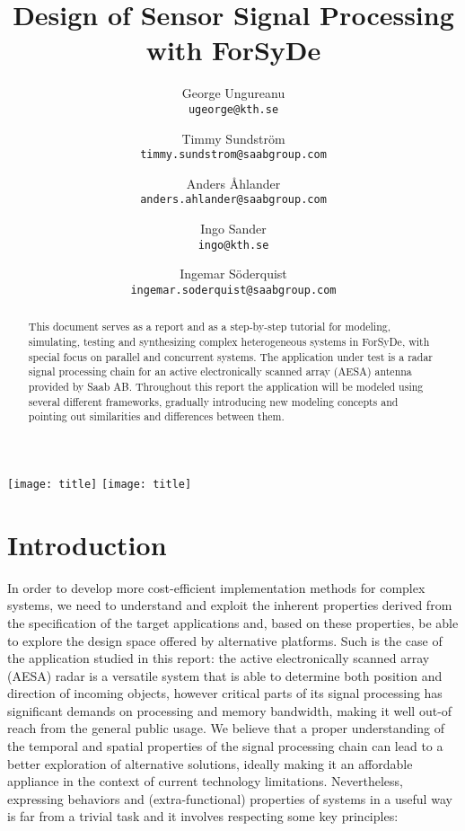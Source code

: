 \documentclass[
  a4paper,
]{article}
\title{Design of Sensor Signal Processing with ForSyDe}
\author{%
George Ungureanu \\{\small\tt ugeorge@kth.se}
 \and
Timmy Sundström \\{\small\tt timmy.sundstrom@saabgroup.com}
 \and
Anders Åhlander \\{\small\tt anders.ahlander@saabgroup.com}
 \and
Ingo Sander \\{\small\tt ingo@kth.se}
 \and
Ingemar Söderquist \\{\small\tt ingemar.soderquist@saabgroup.com}
%
}
\date{}
\begin{document}
\texttt{[image: title]}
\texttt{[image: title]}
\clearpage
{}
\maketitle
\begin{abstract}
This document serves as a report and as a step-by-step tutorial for
modeling, simulating, testing and synthesizing complex heterogeneous
systems in ForSyDe, with special focus on parallel and concurrent
systems. The application under test is a radar signal processing chain
for an active electronically scanned array (AESA) antenna provided by
Saab AB. Throughout this report the application will be modeled using
several different frameworks, gradually introducing new modeling
concepts and pointing out similarities and differences between them.
\end{abstract}

{
\setcounter{tocdepth}{3}
\tableofcontents
}
\clearpage

\hypertarget{sec:intro}{%
\section{Introduction}\label{sec:intro}}

In order to develop more cost-efficient implementation methods for
complex systems, we need to understand and exploit the inherent
properties derived from the specification of the target applications
and, based on these properties, be able to explore the design space
offered by alternative platforms. Such is the case of the application
studied in this report: the active electronically scanned array (AESA)
radar is a versatile system that is able to determine both position and
direction of incoming objects, however critical parts of its signal
processing has significant demands on processing and memory bandwidth,
making it well out-of reach from the general public usage. We believe
that a proper understanding of the temporal and spatial properties of
the signal processing chain can lead to a better exploration of
alternative solutions, ideally making it an affordable appliance in the
context of current technology limitations. Nevertheless, expressing
behaviors and (extra-functional) properties of systems in a useful way
is far from a trivial task and it involves respecting some key
principles:
\end{document}
